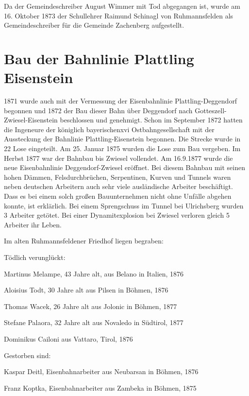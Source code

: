 \documentclass{book}
\begin{document}
Da der Gemeindeschreiber August Wimmer mit Tod abgegangen ist, wurde am 16.
Oktober 1873 der Schullehrer Raimund Schinagl von Ruhmannsfelden als
Gemeindeschreiber für die Gemeinde Zachenberg aufgestellt.

\section{Bau der Bahnlinie Plattling Eisenstein}

1871 wurde auch mit der Vermessung der Eisenbahnlinie Plattling-Deggendorf
begonnen und 1872 der Bau dieser Bahn über Deggendorf nach
Gotteszell-Zwiesel-Eisenstein beschlossen und genehmigt. Schon im September 1872
hatten die Ingeneure der königlich bayerischenxvi Ostbahngesellschaft mit der
Aussteckung der Bahnlinie Plattling-Eisenstein begonnen. Die Strecke wurde in 22
Lose eingeteilt. Am 25. Januar 1875 wurden die Lose zum Bau vergeben. Im Herbst
1877 war der Bahnbau bis Zwiesel vollendet. Am 16.9.1877 wurde die neue
Eisenbahnlinie Deggendorf-Zwiesel eröffnet. Bei diesem Bahnbau mit seinen hohen
Dämmen, Felsdurchbrüchen, Serpentinen, Kurven und Tunnels waren neben deutschen
Arbeitern auch sehr viele ausländische Arbeiter beschäftigt. Dass es bei einem
solch großen Bauunternehmen nicht ohne Unfälle abgehen konnte, ist erklärlich.
Bei einem Sprengschuss im Tunnel bei Ulrichsberg wurden 3 Arbeiter getötet. Bei
einer Dynamitexplosion bei Zwiesel verloren gleich 5 Arbeiter ihr Leben.



Im alten Ruhmannsfeldener Friedhof liegen begraben:



Tödlich verunglückt:



Martinus Melampe, 43 Jahre alt, aus Belano in Italien, 1876

Aloisius Todt, 30 Jahre alt aus Pilsen in Böhmen, 1876

Thomas Wacek, 26 Jahre alt aus Jolonic in Böhmen, 1877

Stefane Palaora, 32 Jahre alt aus Novaledo in Südtirol, 1877

Dominikus Cailoni aus Vattaro, Tirol, 1876



Gestorben sind:



Kaspar Deitl, Eisenbahnarbeiter aus Neubarsan in Böhmen, 1876

Franz Koptka, Eisenbahnarbeiter aus Zambeka in Böhmen, 1875
\end{document}
